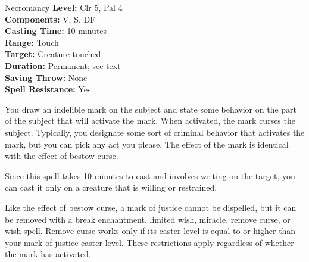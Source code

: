 {Necromancy}
{
	\textbf{Level:}
	Clr 5, Pal 4\\
	\textbf{Components:}
	V, S, DF\\
	\textbf{Casting Time:}
	10 minutes\\
	\textbf{Range:}
	Touch\\
	\textbf{Target:}
	Creature touched\\
	\textbf{Duration:}
	Permanent; see text\\
	\textbf{Saving Throw:}
	None\\
	\textbf{Spell Resistance:}
	Yes\\
}
{
	You draw an indelible mark on the subject and state some behavior on the part of the subject that will activate the mark. When activated, the mark curses the subject. Typically, you designate some sort of criminal behavior that activates the mark, but you can pick any act you please. The effect of the mark is identical with the effect of bestow curse.

	Since this spell takes 10 minutes to cast and involves writing on the target, you can cast it only on a creature that is willing or restrained.

	Like the effect of bestow curse, a mark of justice cannot be dispelled, but it can be removed with a break enchantment, limited wish, miracle, remove curse, or wish spell. Remove curse works only if its caster level is equal to or higher than your mark of justice caster level. These restrictions apply regardless of whether the mark has activated.

}
